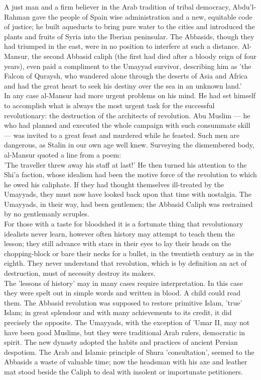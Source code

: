 \documentclass[11pt, b5paper, twoside]{book}
\begin{document}
A just man and a firm believer in the Arab tradition of tribal democracy, Abdu'l-Rahman gave the 
people of Spain wise administration and a new, equitable code of justice; he built aqueducts to bring 
pure water to the cities and introduced the plants and fruits of Syria into the Iberian peninsular. 
The Abbasids, though they had triumped in the east, were in no position to interfere at such a 
distance. Al-Mansur, the second Abbasid caliph (the first had died after a bloody reign of four 
years), even paid a compliment to the Umayyad survivor, describing him as 'the Falcon of Quraysh, who 
wandered alone through the deserts of Asia and Africa and had the great heart to seek his destiny 
over the sea in an unknown land.' \\

In any case al-Mansur had more urgent problems on his mind. He had set himself to accomplish what is 
always the most urgent task for the successful revolutionary: the destruction of the architects of 
revolution. Abu Muslim --- he who had planned and executed the whole campaign with such consummate 
skill --- was invited to a great feast and murdered while he feasted. Such men are dangerous, as Stalin 
in our own age well knew. Surveying the dismembered body, al-Mansur quoted a line from a poem: \\

'The traveller threw away his staff at last!' He then turned his attention to the Shi'a faction, 
whose idealism had been the motive force of the revolution to which he owed his caliphate. If they 
had thought themselves ill-treated by the Umayyads, they must now have looked back upon that time 
with nostalgia. The Umayyads, in their way, had been gentlemen; the Abbasid Caliph was restrained by 
no gentlemanly scruples. \\

For those with a taste for bloodshed it is a fortunate thing that revolutionary idealists never 
learn, however often history may attempt to teach them the lesson; they still advance with stars in 
their eyes to lay their heads on the chopping-block or bare their necks for a bullet, in the 
twentieth century as in the eighth. They never understand that revolution, which is by definition an 
act of destruction, must of necessity destroy its makers. \\

The 'lessons of history' may in many cases require interpretation. In this case they were spelt out 
in simple words and written in blood. A child could read them. The Abbasid revolution was supposed to 
restore primitive Islam, 'true' Islam; in great splendour and with many achievements to its credit, 
it did precisely the opposite. The Umayyads, with the exception of 'Umar II, may not have been good 
Muslims, but they were traditional Arab rulers, democratic in spirit. The new dynasty adopted the 
habits and practices of ancient Persian despotism. The Arab and Islamic principle of Shura 
'consultation', seemed to the Abbasids a waste of valuable time; now the headsman with his axe and 
leather mat stood beside the Caliph to deal with insolent or importunate petitioners. \\
\end{document}
